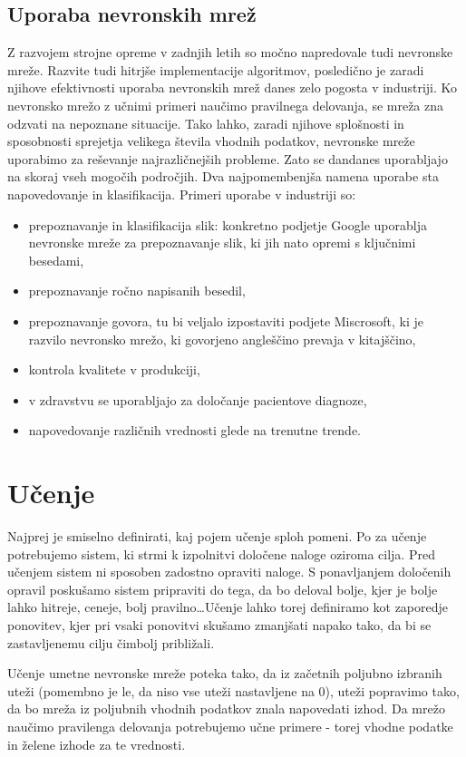 \documentclass[mat1]{fmfdelo}
\begin{document}
\subsection{Uporaba nevronskih mrež}
Z razvojem strojne opreme v zadnjih letih so močno napredovale tudi nevronske mreže. Razvite tudi hitrjše implementacije algoritmov, posledično je zaradi njihove efektivnosti uporaba nevronskih mrež danes zelo pogosta v industriji. Ko nevronsko mrežo z učnimi primeri naučimo pravilnega delovanja, se mreža zna odzvati na nepoznane situacije. Tako lahko, zaradi njihove splošnosti in sposobnosti sprejetja velikega števila vhodnih podatkov, nevronske mreže uporabimo za reševanje najrazličnejših probleme. Zato se dandanes uporabljajo na skoraj vseh mogočih področjih. Dva najpomembenjša namena uporabe sta napovedovanje in klasifikacija. Primeri uporabe v industriji so: 
\begin{itemize}
\item prepoznavanje in klasifikacija slik: konkretno podjetje Google uporablja nevronske mreže za prepoznavanje slik, ki jih nato opremi s ključnimi besedami,
\item prepoznavanje ročno napisanih besedil,
\item prepoznavanje  govora, tu bi veljalo izpostaviti podjete Miscrosoft, ki je razvilo nevronsko mrežo, ki govorjeno angleščino prevaja v kitajščino,
\item kontrola kvalitete v produkciji,
\item v zdravstvu se uporabljajo za določanje pacientove diagnoze,
\item napovedovanje različnih vrednosti glede na trenutne trende.
\end{itemize}
%
\section{Učenje}
Najprej je smiselno definirati, kaj pojem učenje sploh pomeni. Po \cite[str.~37]{kononenko} za učenje potrebujemo sistem, ki strmi k izpolnitvi določene naloge oziroma cilja. Pred učenjem sistem ni sposoben zadostno opraviti naloge. S ponavljanjem določenih opravil poskušamo sistem pripraviti do tega, da bo deloval bolje, kjer je bolje lahko hitreje, ceneje, bolj pravilno\ldots Učenje lahko torej definiramo kot zaporedje ponovitev, kjer pri vsaki ponovitvi skušamo zmanjšati napako tako, da bi se zastavljenemu cilju čimbolj približali. 

Učenje umetne nevronske mreže poteka tako, da iz začetnih poljubno izbranih uteži (pomembno je le, da niso vse uteži nastavljene na 0), uteži popravimo tako, da bo mreža iz poljubnih vhodnih podatkov znala napovedati izhod. Da mrežo naučimo pravilenga delovanja potrebujemo učne primere - torej vhodne podatke in želene izhode za te vrednosti. 
\end{document}
